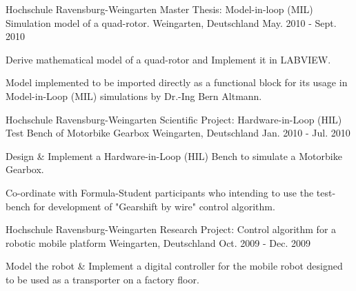 

\begin{cventries}

  \cventry
    {Hochschule Ravensburg-Weingarten} %
    {Master Thesis: Model-in-loop (MIL) Simulation model of a quad-rotor.} %
    {Weingarten, Deutschland} %
    {May. 2010 - Sept. 2010} %
    {
      \begin{cvitems} %
        \item {Derive mathematical model of a quad-rotor and Implement it in LABVIEW.}
        \item {Model implemented to be imported directly as a functional block for its usage in Model-in-Loop (MIL) simulations by Dr.-Ing Bern Altmann.}
      \end{cvitems}
    }
    
  \cventry
    {Hochschule Ravensburg-Weingarten} %
    {Scientific Project: Hardware-in-Loop (HIL) Test Bench of Motorbike Gearbox} %
    {Weingarten, Deutschland} %
    {Jan. 2010 - Jul. 2010} %
    {
      \begin{cvitems} %
      \item {Design \& Implement a Hardware-in-Loop (HIL) Bench to simulate a Motorbike Gearbox.}
      \item {Co-ordinate with Formula-Student participants who intending to use the test-bench for development of "Gearshift by wire" control algorithm.}
      \end{cvitems}
    }
   
  \cventry
    {Hochschule Ravensburg-Weingarten} %
    {Research Project: Control algorithm for a robotic mobile platform} %
    {Weingarten, Deutschland} %
    {Oct. 2009 - Dec. 2009} %
    {
      \begin{cvitems} %
      	\item {Model the robot \& Implement a digital controller for the mobile robot designed to be used as a transporter on a factory floor.}
      \end{cvitems}
    }
    

\end{cventries}
